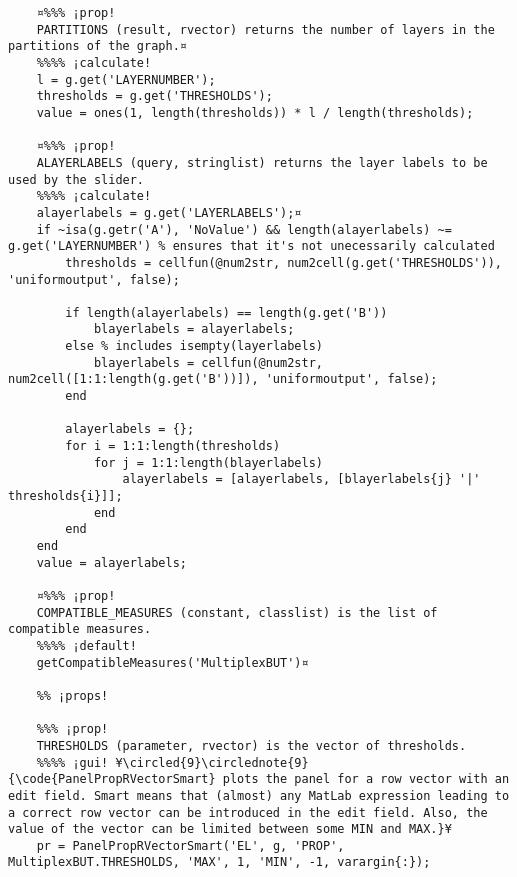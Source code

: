 \documentclass{tufte-handout}
\begin{document}
\begin{lstlisting}
	¤%%% ¡prop!
	PARTITIONS (result, rvector) returns the number of layers in the partitions of the graph.¤
	%%%% ¡calculate!
	l = g.get('LAYERNUMBER');
	thresholds = g.get('THRESHOLDS');
	value = ones(1, length(thresholds)) * l / length(thresholds);
	
	¤%%% ¡prop!
	ALAYERLABELS (query, stringlist) returns the layer labels to be used by the slider.
	%%%% ¡calculate!
	alayerlabels = g.get('LAYERLABELS');¤
	if ~isa(g.getr('A'), 'NoValue') && length(alayerlabels) ~= g.get('LAYERNUMBER') % ensures that it's not unecessarily calculated
		thresholds = cellfun(@num2str, num2cell(g.get('THRESHOLDS')), 'uniformoutput', false);

		if length(alayerlabels) == length(g.get('B'))
			blayerlabels = alayerlabels;
		else % includes isempty(layerlabels)
			blayerlabels = cellfun(@num2str, num2cell([1:1:length(g.get('B'))]), 'uniformoutput', false);
		end
	
		alayerlabels = {};
		for i = 1:1:length(thresholds)
			for j = 1:1:length(blayerlabels)
				alayerlabels = [alayerlabels, [blayerlabels{j} '|' thresholds{i}]];
			end
		end
	end
	value = alayerlabels;
	
	¤%%% ¡prop! 
	COMPATIBLE_MEASURES (constant, classlist) is the list of compatible measures.
	%%%% ¡default!
	getCompatibleMeasures('MultiplexBUT')¤
	
	%% ¡props!
	
	%%% ¡prop!
	THRESHOLDS (parameter, rvector) is the vector of thresholds.
	%%%% ¡gui! ¥\circled{9}\circlednote{9}{\code{PanelPropRVectorSmart} plots the panel for a row vector with an edit field. Smart means that (almost) any MatLab expression leading to a correct row vector can be introduced in the edit field. Also, the value of the vector can be limited between some MIN and MAX.}¥
	pr = PanelPropRVectorSmart('EL', g, 'PROP', MultiplexBUT.THRESHOLDS, 'MAX', 1, 'MIN', -1, varargin{:});
	
	
\end{lstlisting}
\end{document}
